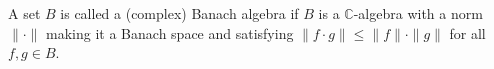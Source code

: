 A set $B$ is called a (complex) Banach algebra if $B$ is a $\mathbb{C}$-algebra with a norm $\|\cdot\|$ making it a Banach space and satisfying $\|f \cdot g\| \leqslant \|f\| \cdot \|g\|$ for all $f, g \in B$.
